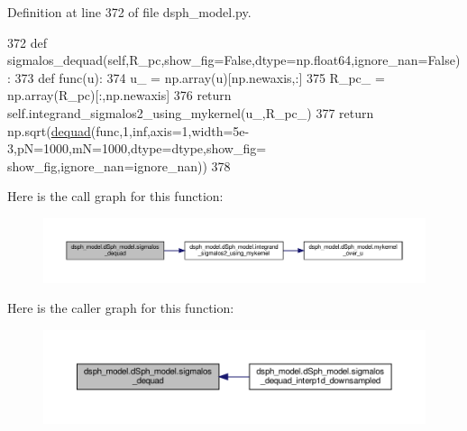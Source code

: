 Definition at line 372 of file dsph\+\_\+model.\+py.


\begin{DoxyCode}
372     \textcolor{keyword}{def }sigmalos\_dequad(self,R\_pc,show\_fig=False,dtype=np.float64,ignore\_nan=False):
373         \textcolor{keyword}{def }func(u):
374             u\_ = np.array(u)[np.newaxis,:]
375             R\_pc\_ = np.array(R\_pc)[:,np.newaxis]
376             \textcolor{keywordflow}{return} self.integrand\_sigmalos2\_using\_mykernel(u\_,R\_pc\_)
377         \textcolor{keywordflow}{return} np.sqrt(\hyperlink{namespacedequad}{dequad}(func,1,inf,axis=1,width=5e-3,pN=1000,mN=1000,dtype=dtype,show\_fig=
      show\_fig,ignore\_nan=ignore\_nan))
378     
\end{DoxyCode}
Here is the call graph for this function\+:\nopagebreak
\begin{figure}[H]
\begin{center}
\leavevmode
\includegraphics[width=350pt]{d0/d25/classdsph__model_1_1dSph__model_a5b73e854e8ac1b1c6a467498cd181e7a_cgraph}
\end{center}
\end{figure}
Here is the caller graph for this function\+:\nopagebreak
\begin{figure}[H]
\begin{center}
\leavevmode
\includegraphics[width=350pt]{d0/d25/classdsph__model_1_1dSph__model_a5b73e854e8ac1b1c6a467498cd181e7a_icgraph}
\end{center}
\end{figure}
\mbox{\label{classdsph__model_1_1dSph__model_a0046cd7677792835d8cfafe83dbe276c}} 
